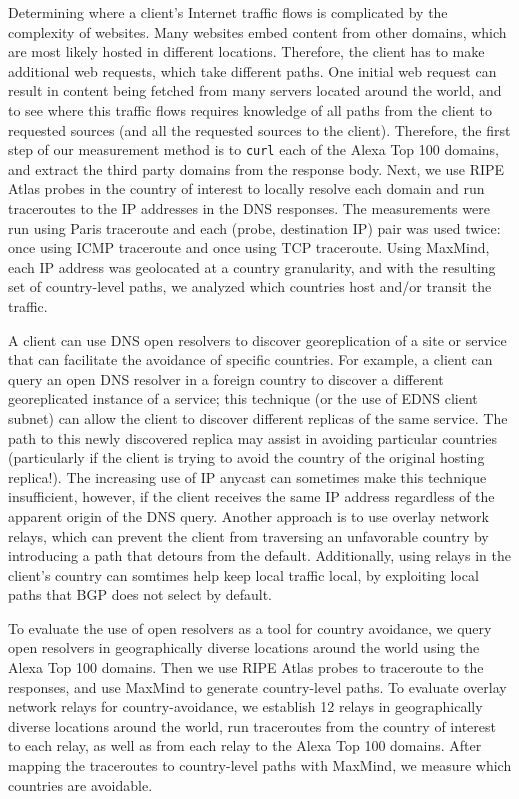 Determining where a client's Internet traffic flows is complicated by
the complexity of websites.  Many
websites embed content from other domains, which are most likely
hosted in different locations.  Therefore, the client has to make
additional web requests, which take different paths.  One initial web
request can result in content being fetched from many servers located
around the world, and to see where this traffic flows requires knowledge
of all paths from the client to requested sources (and all the requested
sources to the client).  Therefore, the first step of our measurement 
method is to {\tt curl} each of the Alexa Top 100 domains, and extract 
the third party domains from the response body.  Next, we use RIPE Atlas 
probes in the country of interest to locally resolve each domain and run 
traceroutes to the IP addresses in the DNS responses.  The measurements 
were run using Paris traceroute and each (probe, destination IP) pair 
was used twice: once using ICMP traceroute and once using TCP traceroute. 
Using MaxMind, each IP address was geolocated at a country granularity, 
and with the resulting set of country-level paths, we analyzed which 
countries host and/or transit the traffic.

A client can use DNS open resolvers to discover georeplication of a site
or service that can facilitate the avoidance of specific countries. For
example, a client can query an open DNS resolver in a foreign country to
discover a different georeplicated instance of a service; this technique
(or the use of EDNS client subnet) can allow the client to discover
different replicas of the same service. The path to this newly
discovered replica may assist in avoiding particular countries
(particularly if the client is trying to avoid the country of the
original hosting replica!).  The increasing use of IP anycast can
sometimes make this technique
insufficient, however, if the client
receives the same IP address regardless of the apparent origin of the
DNS query.  Another approach is to use overlay network relays, which can
prevent the client from traversing an unfavorable country by introducing
a path that detours from the default. Additionally, using
relays in the client's country can somtimes help keep local traffic
local, by exploiting local paths that BGP does not select by default.
  
To evaluate the use of open resolvers as a tool for country avoidance, we
query open resolvers in geographically diverse locations around the world 
using the Alexa Top 100 domains.  Then we use RIPE Atlas probes to traceroute 
to the responses, and use MaxMind to generate country-level paths.  To evaluate 
overlay network relays for country-avoidance, we establish 12 relays in geographically 
diverse locations around the world, run traceroutes from the country of interest to 
each relay, as well as from each relay to the Alexa Top 100 domains.  After mapping 
the traceroutes to country-level paths with MaxMind, we measure which countries are 
avoidable.

